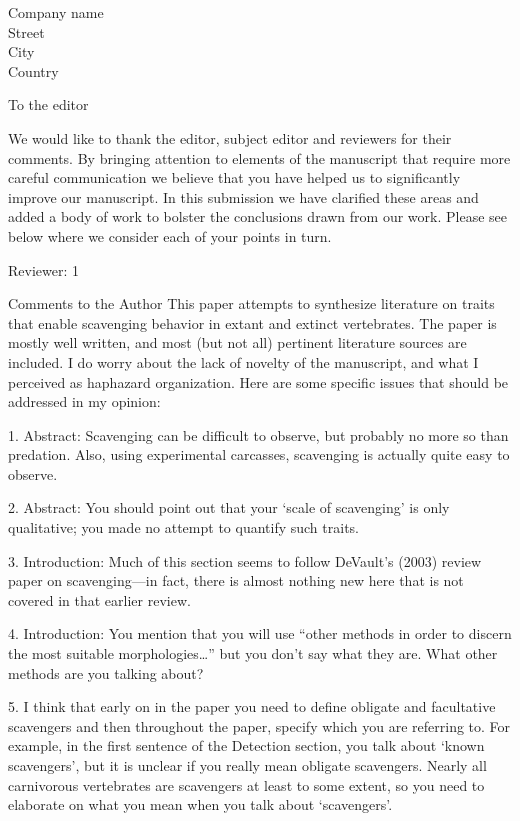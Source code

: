 \documentclass{letter}
\begin{document}
\begin{letter}{Company name \\ Street\\ City\\ Country}
\opening{To the editor}

We would like to thank the editor, subject editor and reviewers for their comments. By bringing attention to elements of the manuscript that require more careful communication we believe that you have helped us to significantly improve our manuscript. In this submission we have clarified these areas and added a body of work to bolster the conclusions drawn from our work. Please see below where we consider each of your points in turn. 

Reviewer: 1

Comments to the Author
This paper attempts to synthesize literature on traits that enable scavenging behavior in extant and extinct vertebrates.  The paper is mostly well written, and most (but not all) pertinent literature sources are included.  I do worry about the lack of novelty of the manuscript, and what I perceived as haphazard organization.  Here are some specific issues that should be addressed in my opinion:

1.      Abstract:  Scavenging can be difficult to observe, but probably no more so than predation.  Also, using experimental carcasses, scavenging is actually quite easy to observe.

2.      Abstract:  You should point out that your ‘scale of scavenging’ is only qualitative; you made no attempt to quantify such traits.

3.      Introduction:  Much of this section seems to follow DeVault’s (2003) review paper on scavenging—in fact, there is almost nothing new here that is not covered in that earlier review.

4.      Introduction:  You mention that you will use “other methods in order to discern the most suitable morphologies…”  but you don’t say what they are.  What other methods are you talking about?

5.      I think that early on in the paper you need to define obligate and facultative scavengers and then throughout the paper, specify which you are referring to.  For example, in the first sentence of the Detection section, you talk about ‘known scavengers’, but it is unclear if you really mean obligate scavengers.  Nearly all carnivorous vertebrates are scavengers at least to some extent, so you need to elaborate on what you mean when you talk about ‘scavengers’.


\end{letter}
\end{document}
